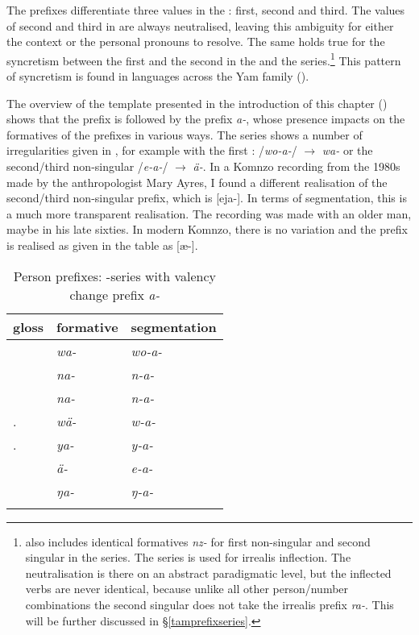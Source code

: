 The prefixes differentiate three  values in the : first, second and third. The values of second and third  in  are always neutralised, leaving this ambiguity for either the context or the personal pronouns to resolve. The same holds true for the syncretism between the first  and the second  in the \Alph{} and the \Gam{} series.\footnote{ also includes identical formatives \emph{nz-} for first non-singular and second singular in the \Bet{} series. The \Bet{} series is used for irrealis inflection. The neutralisation is there on an abstract paradigmatic level, but the inflected verbs are never identical, because {\textendash} unlike all other person/number combinations {\textendash} the second singular does not take the irrealis prefix \emph{ra-}. This will be further discussed in {\S}\ref{tamprefixseries}.} This pattern of syncretism is found in languages across the Yam family (\citealt{Evans:sng}).

The overview of the  template presented in the introduction of this chapter () shows that the  prefix is followed by the  prefix \emph{a-}, whose presence impacts on the formatives of the  prefixes in various ways. The \Alph{} series shows a number of irregularities given in , for example with the first : /\emph{wo-a-}/ $\rightarrow$ \emph{wa-} or the second/third non-singular /\emph{e-a-}/ $\rightarrow$ \emph{ä-}. In a Komnzo recording from the 1980s made by the anthropologist Mary Ayres, I found a different realisation of the second/third non-singular prefix, which is [eja-]. In terms of segmentation, this is a much more transparent realisation. The recording was made with an older man, maybe in his late sixties. In modern Komnzo, there is no variation and the prefix is realised as given in the table as [æ-].

\begin{table}
\caption{Person prefixes: \Alph-series with valency change prefix \emph{a-}}
\label{persprefwithvalencychange}
	\begin{tabularx}{.6\textwidth}{XXl}
		\lsptoprule
		{gloss} &{formative} &{segmentation}\\\midrule
		\Fsg &\emph{wa-} &\emph{wo-a-}\\
		\Fnsg &\emph{na-} &\emph{n-a-}\\
		\Ssg &\emph{na-} &\emph{n-a-}\\
		\Tsg.\F	&\emph{wä-} &\emph{w-a-}\\
		\Tsg.\Masc &\emph{ya-} &\emph{y-a-}\\
		\Stnsg &\emph{ä-} &\emph{e-a-}\\
		\M &\emph{ŋa-} &\emph{ŋ-a-}\\
		\lspbottomrule
	\end{tabularx}
\end{table}%
 

